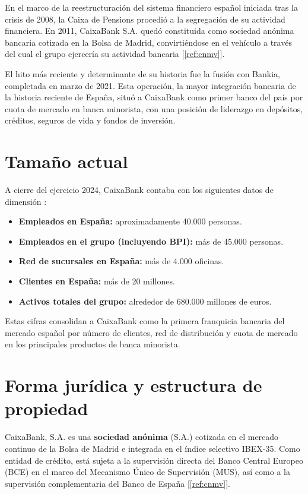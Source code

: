 En el marco de la reestructuración del sistema financiero español iniciada tras la crisis
de 2008, la Caixa de Pensions procedió a la segregación de su actividad financiera.
En 2011, CaixaBank S.A. quedó constituida como sociedad anónima bancaria cotizada en la
Bolsa de Madrid, convirtiéndose en el vehículo a través del cual el grupo ejercería su
actividad bancaria [\ref{ref:cnmv}].

El hito más reciente y determinante de su historia fue la fusión con Bankia, completada en
marzo de 2021. Esta operación, la mayor integración bancaria de la historia reciente de
España, situó a CaixaBank como primer banco del país por cuota de mercado en banca
minorista, con una posición de liderazgo en depósitos, créditos, seguros de vida y fondos
de inversión.

\section{Tamaño actual}

A cierre del ejercicio 2024, CaixaBank contaba con los siguientes datos de dimensión
:

\begin{itemize}
  \item \textbf{Empleados en España:} aproximadamente 40.000 personas.
  \item \textbf{Empleados en el grupo (incluyendo BPI):} más de 45.000 personas.
  \item \textbf{Red de sucursales en España:} más de 4.000 oficinas.
  \item \textbf{Clientes en España:} más de 20 millones.
  \item \textbf{Activos totales del grupo:} alrededor de 680.000 millones de euros.
\end{itemize}

Estas cifras consolidan a CaixaBank como la primera franquicia bancaria del mercado
español por número de clientes, red de distribución y cuota de mercado en los principales
productos de banca minorista.

\section{Forma jurídica y estructura de propiedad}

CaixaBank, S.A. es una \textbf{sociedad anónima} (S.A.) cotizada en el mercado continuo
de la Bolsa de Madrid e integrada en el índice selectivo IBEX-35. Como entidad de crédito,
está sujeta a la supervisión directa del Banco Central Europeo (BCE) en el marco del
Mecanismo Único de Supervisión (MUS), así como a la supervisión complementaria del Banco
de España [\ref{ref:cnmv}].

